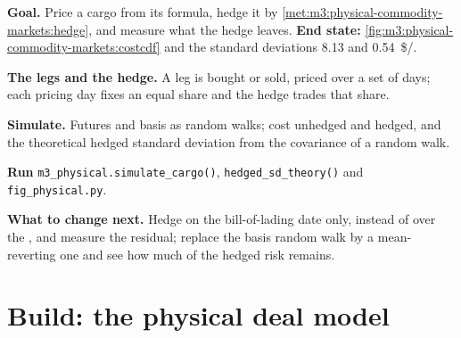 \begin{tutorial}
\textbf{Goal.} Price a cargo from its formula, hedge it by
\cref{met:m3:physical-commodity-markets:hedge}, and measure what the hedge leaves.
\textbf{End state:} \cref{fig:m3:physical-commodity-markets:costcdf} and the
standard deviations \qty{8.13}{} and \qty{0.54}{\$/\barrel}.
\begin{tutsteps}
\item \textbf{The legs and the hedge.} A leg is bought or sold, priced over a set of
days; each pricing day fixes an equal share and the hedge trades that share.
\label{lst:m3:physical-commodity-markets:legs}
\item \textbf{Simulate.} Futures and basis as random walks; cost unhedged and hedged,
and the theoretical hedged standard deviation from the covariance of a random walk.
\label{lst:m3:physical-commodity-markets:sim}
\item \textbf{Run} \texttt{m3\_physical.simulate\_cargo()},
\texttt{hedged\_sd\_theory()} and \texttt{fig\_physical.py}.
\end{tutsteps}
\textbf{What to change next.} Hedge on the bill-of-lading date only, instead of
over the , and measure the residual; replace the basis random walk by a
mean-reverting one and see how much of the hedged risk remains.
\end{tutorial}

\section{Build: the physical deal model}\label{bld:m3:physical-commodity-markets:physdeal}

